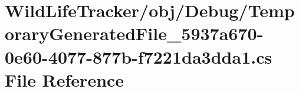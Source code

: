 \hypertarget{TemporaryGeneratedFile__5937a670-0e60-4077-877b-f7221da3dda1_8cs}{}\section{Wild\+Life\+Tracker/obj/\+Debug/\+Temporary\+Generated\+File\+\_\+5937a670-\/0e60-\/4077-\/877b-\/f7221da3dda1.cs File Reference}
\label{TemporaryGeneratedFile__5937a670-0e60-4077-877b-f7221da3dda1_8cs}
